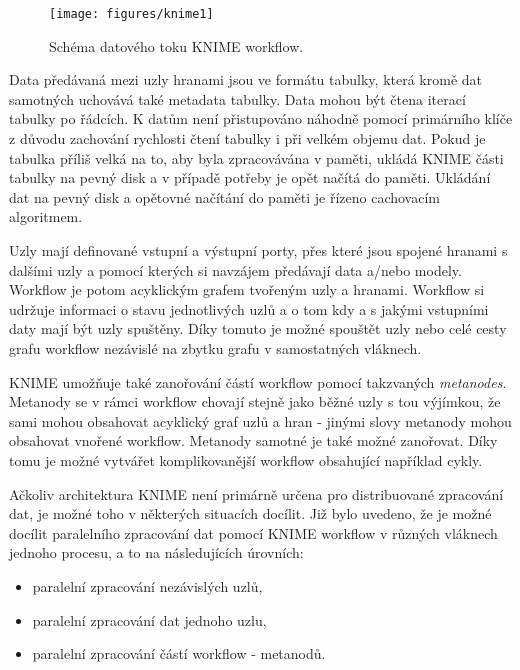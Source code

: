 \documentclass[11pt,twoside,a4paper]{book}
\begin{document}
\begin{figure}
\begin{center}
\label{fig:knime1}
\texttt{[image: figures/knime1]}
\caption{Schéma datového toku KNIME workflow.\cite{knime01}}
\end{center}
\end{figure}

			Data předávaná mezi uzly hranami jsou ve formátu tabulky, která kromě dat samotných uchovává také metadata tabulky. Data mohou být čtena iterací tabulky po řádcích. K datům není přistupováno náhodně pomocí primárního klíče z důvodu zachování rychlosti čtení tabulky i při velkém objemu dat. Pokud je tabulka příliš velká na to, aby byla zpracovávána v paměti, ukládá KNIME části tabulky na pevný disk a v případě potřeby je opět načítá do paměti. Ukládání dat na pevný disk a opětovné načítání do paměti je řízeno cachovacím algoritmem.

			Uzly mají definované vstupní a výstupní porty, přes které jsou spojené hranami s dalšími uzly a pomocí kterých si navzájem předávají data a/nebo modely. Workflow je potom acyklickým grafem tvořeným uzly a hranami. Workflow si udržuje informaci o stavu jednotlivých uzlů a o tom kdy a s jakými vstupními daty mají být uzly spuštěny. Díky tomuto je možné spouštět uzly nebo celé cesty grafu workflow nezávislé na zbytku grafu v samostatných vláknech.\cite{knime01, knimeb02}

			KNIME umožňuje také zanořování částí workflow pomocí takzvaných \textit{metanodes}. Metanody se v rámci workflow chovají stejně jako běžné uzly s tou výjímkou, že sami mohou obsahovat acyklický graf uzlů a hran - jinými slovy metanody mohou obsahovat vnořené workflow. Metanody samotné je také možné zanořovat. Díky tomu je možné vytvářet komplikovanější workflow obsahující například cykly. 

			Ačkoliv architektura KNIME není primárně určena pro distribuované zpracování dat, je možné toho v některých situacích docílit. Již bylo uvedeno, že je možné docílit paralelního zpracování dat pomocí KNIME workflow v různých vláknech jednoho procesu, a to na následujících úrovních:

\begin{itemize}
\item{paralelní zpracování nezávislých uzlů,}
\item{paralelní zpracování dat jednoho uzlu,}
\item{paralelní zpracování částí workflow - metanodů.}
\end{itemize} 
\end{document}
